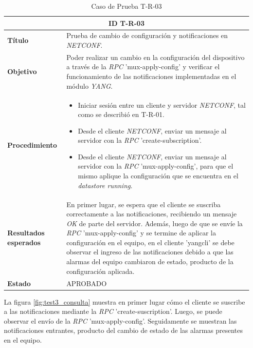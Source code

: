   \begin{table}[H]
    \centering
    \begin{tabular}{ |m{2.5cm}|m{11cm}|  }
    \hline
    \multicolumn{2}{|c|}{ \textbf{ID T-R-03} } \\
    \hline
    \centering
    \textbf{Título} & Prueba de cambio de configuración y notificaciones en \textit{NETCONF}. \\
    \hline
    \centering
    \textbf{Objetivo} & Poder realizar un cambio en la configuración del dispositivo a través de la \textit{RPC} 'mux-apply-config' y verificar el funcionamiento de las notificaciones implementadas en el módulo \textit{YANG}.  \\
    \hline
    \centering
    \textbf{Procedimiento} & \begin{itemize}
      \item Iniciar sesión entre un cliente y servidor \textit{NETCONF}, tal como se describió en T-R-01.
      \item Desde el cliente \textit{NETCONF}, enviar un mensaje al servidor con la \textit{RPC} 'create-subscription'.
      \item Desde el cliente \textit{NETCONF}, enviar un mensaje al servidor con la \textit{RPC} 'mux-apply-config', para que el mismo aplique la configuración que se encuentra en el \textit{datastore running}.
    \end{itemize}     \\
    \hline
    \centering
    \textbf{Resultados esperados} & 
    En primer lugar, se espera que el cliente se suscriba correctamente a las notificaciones, recibiendo un mensaje \textit{OK} de parte del servidor. 
Además, luego de que se envíe la \textit{RPC} 'mux-apply-config' y se termine de aplicar la configuración en el equipo, en el cliente 'yangcli' se debe observar el ingreso de las notificaciones debido a que las alarmas del equipo cambiaron de estado, producto de la configuración aplicada. 
      \\
    
      \hline
    \centering
      \textbf{Estado}    & APROBADO  \\
    \hline
    \end{tabular}
    
    \caption{Caso de Prueba T-R-03}
    \label{tab:TR03}
    \end{table}


  La figura \ref{fig:test3_consulta} muestra en primer lugar cómo el cliente se suscribe a las notificaciones mediante la  \textit{RPC} 'create-suscription'. Luego, se puede observar el envío de la  \textit{RPC} 'mux-apply-config'. Seguidamente se muestran las notificaciones entrantes, producto del cambio de estado de las alarmas presentes en el equipo.
  
